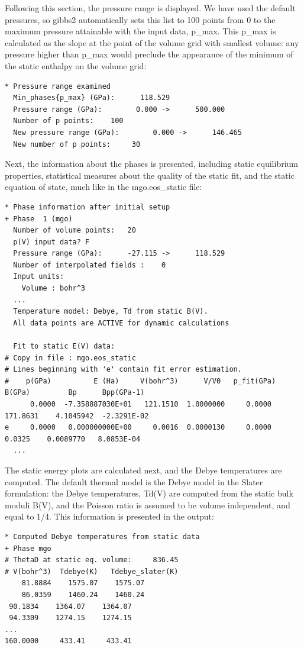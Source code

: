 \documentclass[a4paper]{article}
\begin{document}
Following this section, the pressure range is displayed. We have
used the default pressures, so gibbs2 automatically sets this list to
100 points from 0 to the maximum pressure attainable with the input
data, p\_max. This p\_max is calculated as the slope at the point of the
volume grid with smallest volume: any pressure higher than p\_max would
preclude the appearance of the minimum of the static enthalpy on the
volume grid:
%
\asciilist
\begin{lstlisting}
* Pressure range examined
  Min_phases{p_max} (GPa):      118.529
  Pressure range (GPa):        0.000 ->      500.000
  Number of p points:    100
  New pressure range (GPa):        0.000 ->      146.465
  New number of p points:     30
\end{lstlisting}

Next, the information about the phases is presented, including static
equilibrium properties, statistical measures about the quality of the
static fit, and the static equation of state, much like in the
mgo.eos\_static file:
%
\asciilist
\begin{lstlisting}
* Phase information after initial setup
+ Phase  1 (mgo)
  Number of volume points:   20
  p(V) input data? F
  Pressure range (GPa):      -27.115 ->      118.529
  Number of interpolated fields :    0
  Input units:
    Volume : bohr^3
  ...
  Temperature model: Debye, Td from static B(V).
  All data points are ACTIVE for dynamic calculations

  Fit to static E(V) data:
# Copy in file : mgo.eos_static
# Lines beginning with 'e' contain fit error estimation.
#    p(GPa)          E (Ha)     V(bohr^3)      V/V0   p_fit(GPa)   B(GPa)         Bp      Bpp(GPa-1)
      0.0000  -7.358887030E+01   121.1510  1.0000000     0.0000   171.8631    4.1045942  -2.3291E-02
e     0.0000   0.000000000E+00     0.0016  0.0000130     0.0000     0.0325    0.0089770   8.0853E-04
  ...
\end{lstlisting}

The static energy plots are calculated next, and the Debye
temperatures are computed. The default thermal model is the Debye
model in the Slater formulation: the Debye temperatures, Td(V) are
computed from the static bulk moduli B(V), and the Poisson ratio is
assumed to be volume independent, and equal to 1/4. This information
is presented in the output:
%
\asciilist
\begin{lstlisting}
* Computed Debye temperatures from static data
+ Phase mgo
# ThetaD at static eq. volume:     836.45
# V(bohr^3)  Tdebye(K)   Tdebye_slater(K)
    81.8884    1575.07    1575.07
    86.0359    1460.24    1460.24
 90.1834    1364.07    1364.07
 94.3309    1274.15    1274.15
...
160.0000     433.41     433.41
\end{lstlisting}
\end{document}
